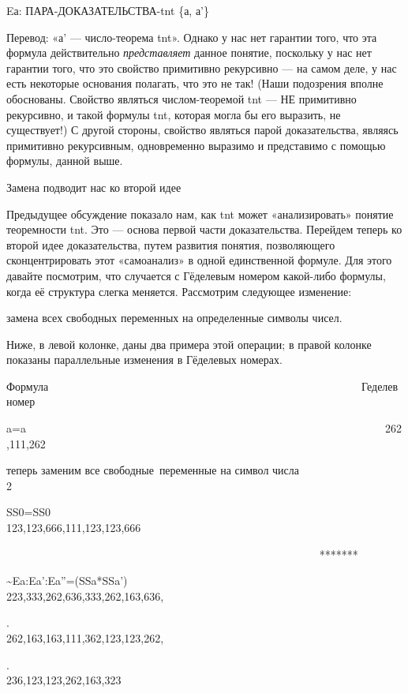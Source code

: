 \documentclass[../main.tex]{subfiles}
\begin{document}
Eа: ПАРА-ДОКАЗАТЕЛЬСТВА-\acs{tnt} \{а, а'\}

Перевод: «а' --- число-теорема \acs{tnt}». Однако у нас нет гарантии того, что эта формула действительно \emph{представляет} данное понятие, поскольку у нас нет гарантии того, что это свойство примитивно рекурсивно --- на самом деле, у нас есть некоторые основания полагать, что это не так! (Наши подозрения вполне обоснованы. Свойство являться числом-теоремой \acs{tnt} --- НЕ примитивно рекурсивно, и такой формулы \acs{tnt}, которая могла бы его выразить, не существует!) С другой стороны, свойство являться парой доказательства, являясь примитивно рекурсивным, одновременно выразимо и представимо с помощью формулы, данной выше.

Замена подводит нас ко второй идее

Предыдущее обсуждение показало нам, как \acs{tnt} может «анализировать» понятие теоремности \acs{tnt}\@. Это --- основа первой части доказательства. Перейдем теперь ко второй идее доказательства, путем развития понятия, позволяющего сконцентрировать этот «самоанализ» в одной единственной формуле. Для этого давайте посмотрим, что случается с Гёделевым номером какой-либо формулы, когда её структура слегка меняется. Рассмотрим следующее изменение:

замена всех свободных переменных на определенные символы чисел.

Ниже, в левой колонке, даны два примера этой операции; в правой колонке показаны параллельные изменения в Гёделевых номерах.

Формула~~~~~~~~~~~~~~~~~~~~~~~~~~~~~~~~~~~~~~~~~~~~~~~~~~~~~~~~ Геделев номер

a=a~~~~~~~~~~~~~~~~~~~~~~~~~~~~~~~~~~~~~~~~~~~~~~~~~~~~~~~~~~~~~~~~~262,111,262

теперь заменим все свободные~переменные на символ числа 2~~~~~~~~~~~~~~~~~~~~~~

SS0=SS0~~~~~~~~~~~~~~~~~~~~~~~~~~~~~~~~~~~~~~~~~~~~~~~~~~~~~~~~~ 123,123,666,111,123,123,666

~~~~~~~~~~~~~~~~~~~~~~~~~~~~~~~~~~~~~~~~~~~~~~~~~~~~~~~~ *******

\textasciitilde Ea:Ea':Ea''=(SSa*SSa')~~~~~~~~~~~~~~~~~~~~~~~~~~~~~~~~~~~~~ 223,333,262,636,333,262,163,636,

.~~~~~~~~~~~~~~~~~~~~~~~~~~~~~~~~~~~~~~~~~~~~~~~~~~~~~~~~~~~~~~~~~~~ 262,163,163,111,362,123,123,262,

.~~~~~~~~~~~~~~~~~~~~~~~~~~~~~~~~~~~~~~~~~~~~~~~~~~~~~~~~~~~~~~~~~~~ 236,123,123,262,163,323
\end{document}
